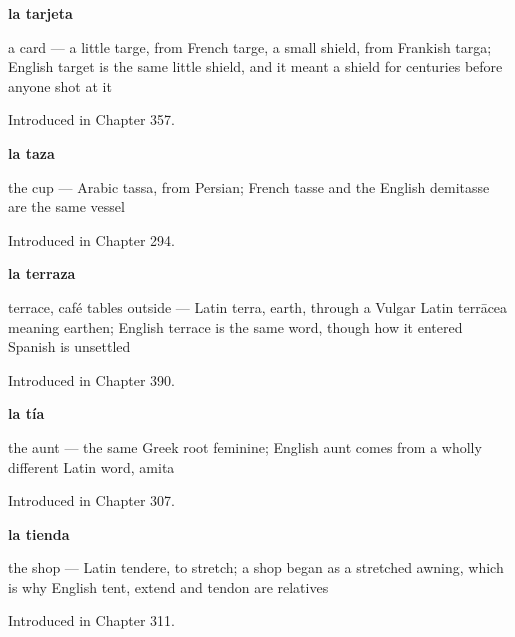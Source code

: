\noindent\begin{minipage}[t]{\linewidth}
\raggedright
\textbf{la tarjeta}\par
\small a card — a little targe, from French targe, a small shield, from Frankish targa; English target is the same little shield, and it meant a shield for centuries before anyone shot at it\par
\footnotesize Introduced in Chapter 357.
\end{minipage}\par\medskip

\noindent\begin{minipage}[t]{\linewidth}
\raggedright
\textbf{la taza}\par
\small the cup — Arabic tassa, from Persian; French tasse and the English demitasse are the same vessel\par
\footnotesize Introduced in Chapter 294.
\end{minipage}\par\medskip

\noindent\begin{minipage}[t]{\linewidth}
\raggedright
\textbf{la terraza}\par
\small terrace, café tables outside — Latin terra, earth, through a Vulgar Latin terrācea meaning earthen; English terrace is the same word, though how it entered Spanish is unsettled\par
\footnotesize Introduced in Chapter 390.
\end{minipage}\par\medskip

\noindent\begin{minipage}[t]{\linewidth}
\raggedright
\textbf{la tía}\par
\small the aunt --- the same Greek root feminine; English aunt comes from a wholly different Latin word, amita\par
\footnotesize Introduced in Chapter 307.
\end{minipage}\par\medskip

\noindent\begin{minipage}[t]{\linewidth}
\raggedright
\textbf{la tienda}\par
\small the shop — Latin tendere, to stretch; a shop began as a stretched awning, which is why English tent, extend and tendon are relatives\par
\footnotesize Introduced in Chapter 311.
\end{minipage}\par\medskip

